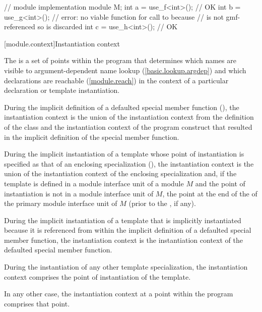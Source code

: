 \begin{std.txt}
\begin{example}
\begin{codeblock}
// module  implementation
module M;
int a = use_f<int>(); // OK
int b = use_g<int>(); // error: no viable function for call to  because
                      //  is not gmf-referenced so is discarded
int c = use_h<int>(); // OK
\end{codeblock}
\end{example}
\end{std.txt}

[module.context]{Instantiation context}

\begin{std.txt}\color{addclr}
\pnum
The  is a set of points within the program
that determines which names are visible to argument-dependent name lookup
(\ref{basic.lookup.argdep})
and which declarations are reachable (\ref{module.reach})
in the context of a particular declaration or template instantiation.

\pnum
During the implicit definition of a defaulted special member function
(),
the instantiation context is the union of
the instantiation context from the definition of the class and
the instantiation context of the program construct that
resulted in the implicit definition of the special member function.

\pnum
During the implicit instantiation of a template
whose point of instantiation is specified as
that of an enclosing specialization (),
the instantiation context is the union of
the instantiation context of the enclosing specialization and,
if the template is defined in a module interface unit of a module $M$
and the point of instantiation is not in a module interface unit of $M$,
the point at the end of the
 of the
primary module interface unit of $M$
(prior to the , if any).

\pnum
During the implicit instantiation of a template
that is implicitly instantiated because it is referenced
from within the implicit definition of a defaulted special member function,
the instantiation context is the instantiation context of
the defaulted special member function.

\pnum
During the instantiation of any other template specialization,
the instantiation context comprises the point of instantiation
of the template.

\pnum
In any other case, the instantiation context
at a point within the program
comprises that point.


\end{std.txt}
